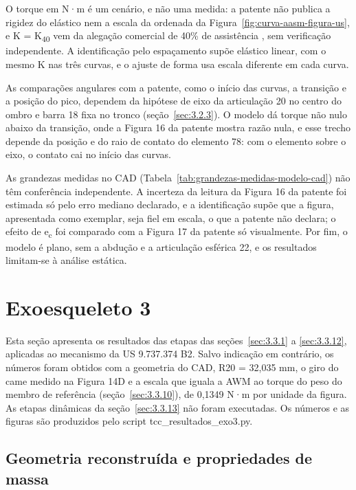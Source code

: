 O torque em N·m é um cenário, e não uma medida: a patente não publica a rigidez do elástico nem a escala da ordenada da Figura~\ref{fig:curva-aasm-figura-us}, e K = K\textsubscript{40} vem da alegação comercial de 40\% de assistência \cite{suitx}, sem verificação independente. A identificação pelo espaçamento supõe elástico linear, com o mesmo K nas três curvas, e o ajuste de forma usa escala diferente em cada curva.

As comparações angulares com a patente, como o início das curvas, a transição e a posição do pico, dependem da hipótese de eixo da articulação 20 no centro do ombro e barra 18 fixa no tronco (seção~\ref{sec:3.2.3}). O modelo dá torque não nulo abaixo da transição, onde a Figura 16 da patente mostra razão nula, e esse trecho depende da posição e do raio de contato do elemento 78: com o elemento sobre o eixo, o contato cai no início das curvas.

As grandezas medidas no CAD (Tabela~\ref{tab:grandezas-medidas-modelo-cad}) não têm conferência independente. A incerteza da leitura da Figura 16 da patente foi estimada só pelo erro mediano declarado, e a identificação supõe que a figura, apresentada como exemplar, seja fiel em escala, o que a patente não declara; o efeito de e\textsubscript{c} foi comparado com a Figura 17 da patente só visualmente. Por fim, o modelo é plano, sem a abdução e a articulação esférica 22, e os resultados limitam-se à análise estática.

\section{Exoesqueleto 3}\label{sec:4.3}

Esta seção apresenta os resultados das etapas das seções~\ref{sec:3.3.1} a \ref{sec:3.3.12}, aplicadas ao mecanismo da US 9.737.374 B2. Salvo indicação em contrário, os números foram obtidos com a geometria do CAD, R20 = 32,035 mm, o giro do came medido na Figura 14D e a escala que iguala a AWM ao torque do peso do membro de referência (seção~\ref{sec:3.3.10}), de 0,1349 N·m por unidade da figura. As etapas dinâmicas da seção~\ref{sec:3.3.13} não foram executadas. Os números e as figuras são produzidos pelo script tcc\_resultados\_exo3.py.

\subsection{Geometria reconstruída e propriedades de massa}\label{sec:4.3.1}

